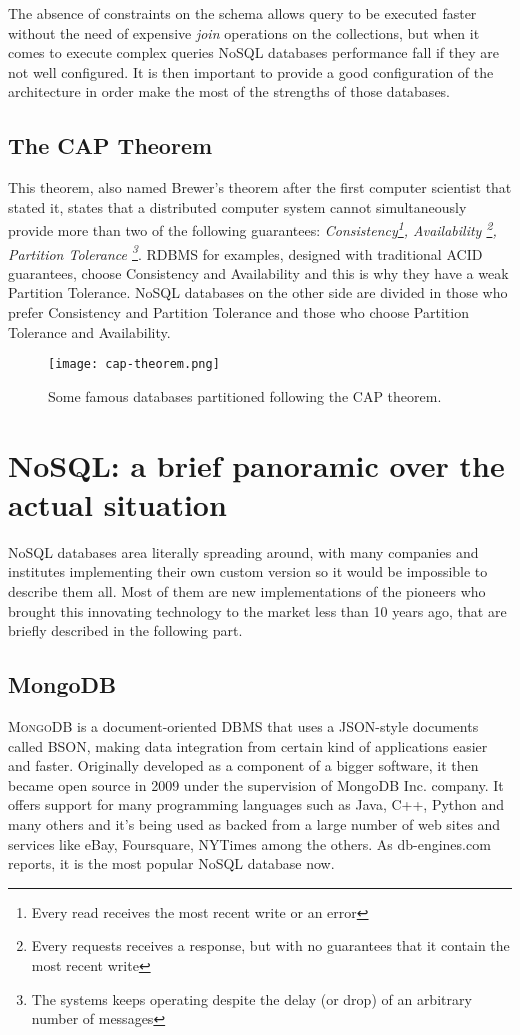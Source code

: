 The absence of constraints on the schema allows query to be executed faster without the need of expensive \textit{join} operations on the collections, but when it comes to execute complex queries NoSQL databases performance fall if they are not well configured.
It is then important to provide a good configuration of the architecture in order make the most of the strengths of those databases.




\subsection{The CAP Theorem}
This theorem, also named Brewer's theorem after the first computer scientist that stated it, states that a distributed computer system cannot simultaneously provide more than two of the following guarantees: \textit{Consistency\footnote {Every read receives the most recent write or an error}, Availability \footnote{Every requests receives a response, but with no guarantees that it contain the most recent write}, Partition Tolerance \footnote{The systems keeps operating despite the delay (or drop) of an arbitrary number of messages }}.
RDBMS for examples, designed with traditional ACID guarantees, choose Consistency and Availability and this is why they have a weak Partition Tolerance.
NoSQL databases on the other side are divided in those who prefer Consistency and Partition Tolerance and those who choose Partition Tolerance and Availability.
\begin{figure}[H]
\texttt{[image: cap-theorem.png]}
\centering
\caption{Some famous databases partitioned following the CAP theorem.}
\end{figure}



\section {NoSQL: a brief panoramic over the actual situation}
NoSQL databases area literally spreading around, with many companies and institutes implementing their own custom version so it would be impossible to describe them all. 
Most of them are new implementations of the pioneers who brought this innovating technology to the market less than 10 years ago, that are briefly described in the following part.

\subsection{MongoDB}
\textsc{MongoDB} is a document-oriented DBMS that uses a JSON-style documents called BSON, making data integration from certain kind of applications easier and faster.
Originally developed as a component of a bigger software, it then became open source in 2009 under the supervision of MongoDB Inc. company.
It offers support for many programming languages such as Java, C++, Python and many others and it’s being used as backed from a large number of web sites and services like eBay, Foursquare, NYTimes among the others.
As db-engines.com reports, it is the most popular NoSQL database now.


